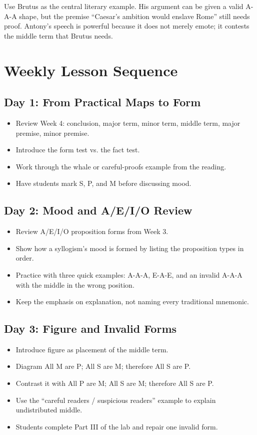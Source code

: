 \documentclass[12pt]{article}
\begin{document}
Use Brutus as the central literary example. His argument can be given a valid A-A-A shape, but the premise ``Caesar's ambition would enslave Rome'' still needs proof. Antony's speech is powerful because it does not merely emote; it contests the middle term that Brutus needs.

\section*{Weekly Lesson Sequence}

\subsection*{Day 1: From Practical Maps to Form}
\begin{itemize}[leftmargin=*]
\item Review Week 4: conclusion, major term, minor term, middle term, major premise, minor premise.
\item Introduce the form test vs. the fact test.
\item Work through the whale or careful-proofs example from the reading.
\item Have students mark S, P, and M before discussing mood.
\end{itemize}

\subsection*{Day 2: Mood and A/E/I/O Review}
\begin{itemize}[leftmargin=*]
\item Review A/E/I/O proposition forms from Week 3.
\item Show how a syllogism's mood is formed by listing the proposition types in order.
\item Practice with three quick examples: A-A-A, E-A-E, and an invalid A-A-A with the middle in the wrong position.
\item Keep the emphasis on explanation, not naming every traditional mnemonic.
\end{itemize}

\subsection*{Day 3: Figure and Invalid Forms}
\begin{itemize}[leftmargin=*]
\item Introduce figure as placement of the middle term.
\item Diagram All M are P; All S are M; therefore All S are P.
\item Contrast it with All P are M; All S are M; therefore All S are P.
\item Use the ``careful readers / suspicious readers'' example to explain undistributed middle.
\item Students complete Part III of the lab and repair one invalid form.
\end{itemize}
\end{document}
